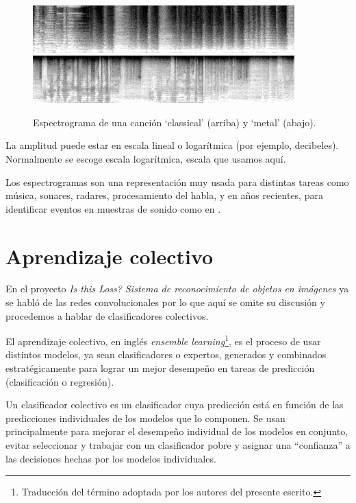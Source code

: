 \documentclass[spanish,11pt,letterpaper]{article}
\begin{document}
\begin{figure}[h]
\centering
\includegraphics[width=0.9\textwidth]{specgram_classical.png}
\includegraphics[width=0.9\textwidth]{specgram_metal.png}
\caption{Espectrograma de una canción `classical' (arriba) y `metal' (abajo).}
\label{fig:specgram}
\end{figure}

La amplitud puede estar en escala lineal o logarítmica (por ejemplo, decibeles).
Normalmente se escoge escala logarítmica, escala que usamos aquí.

Los espectrogramas son una representación muy usada para distintas tareas como
música, sonares, radares, procesamiento del habla, y en años recientes, para
identificar eventos en muestras de sonido como en \cite{audio_recognition}.

\section{Aprendizaje colectivo}

En el proyecto \textit{Is this Loss? Sistema de reconocimiento de objetos en
imágenes} ya se habló de las redes convolucionales por lo que aquí se omite su
discusión y procedemos a hablar de clasificadores colectivos.

El aprendizaje colectivo, en inglés \textit{ensemble learning}\footnote{Traducción
del término adoptada por los autores del presente escrito.}, es el proceso de usar
distintos modelos, ya sean clasificadores o expertos, generados y combinados
estratégicamente para lograr un mejor desempeño en tareas de predicción (clasificación
o regresión).

Un clasificador colectivo es un clasificador cuya predicción está en función de
las predicciones individuales de los modelos que lo componen. Se usan principalmente
para mejorar el desempeño individual de los modelos en conjunto, evitar seleccionar y trabajar
con un clasificador pobre y asignar una ``confianza'' a las decisiones hechas
por los modelos individuales\cite{scholarpedia}.
\end{document}
